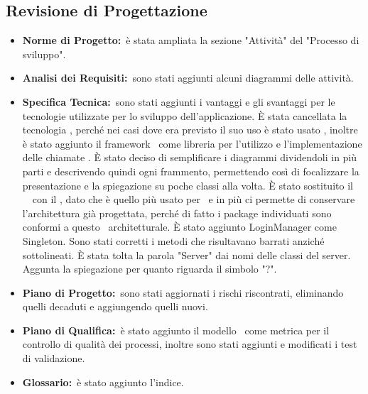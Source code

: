 	\subsection{Revisione di Progettazione}
	\label{revisioneDiProgettazione}
		\begin{itemize}
			\item \textbf{Norme di Progetto:}\ è stata ampliata la sezione "Attività" del "Processo di sviluppo".
			\item \textbf{Analisi dei Requisiti:}\ sono stati aggiunti alcuni diagrammi delle attività.
			\item \textbf{Specifica Tecnica:}\ sono stati aggiunti i vantaggi e gli svantaggi per le tecnologie utilizzate per lo sviluppo dell'applicazione. È stata cancellata la tecnologia , perché nei casi dove era previsto il suo uso è stato usato , inoltre è stato aggiunto il framework \ come libreria per l'utilizzo e l'implementazione delle chiamate . È stato deciso di semplificare i diagrammi dividendoli in più parti e descrivendo quindi ogni frammento, permettendo così di focalizzare la presentazione e la spiegazione su poche classi alla volta. È stato sostituito il \ \ con il , dato che è quello più usato per \ e in più ci permette di conservare l'architettura già progettata, perché di fatto i package individuati sono conformi a questo \ architetturale. È stato aggiunto LoginManager come Singleton. Sono stati corretti i metodi che risultavano barrati anziché sottolineati. È stata tolta la parola "Server" dai nomi delle classi del server. Aggunta la spiegazione per quanto riguarda il simbolo "?".
			\item \textbf{Piano di Progetto:}\ sono stati aggiornati i rischi riscontrati, eliminando quelli decaduti e aggiungendo quelli nuovi.
			\item \textbf{Piano di Qualifica:}\ è stato aggiunto il modello \ come metrica per il controllo di qualità dei processi, inoltre sono stati aggiunti e modificati i test di validazione.
			\item \textbf{Glossario:}\ è stato aggiunto l'indice.
		\end{itemize}